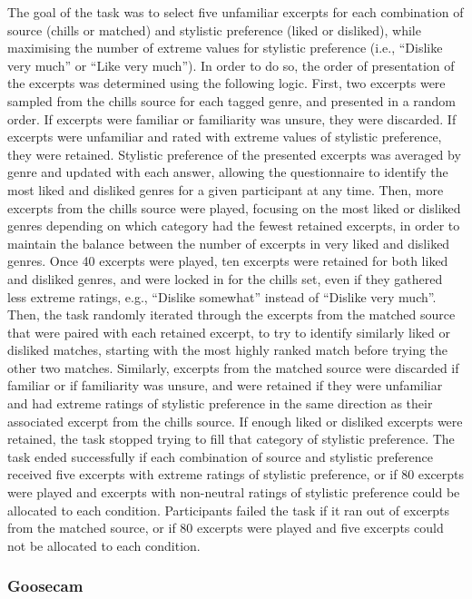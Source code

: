 The goal of the task was to select five unfamiliar excerpts for each combination of source (chills or matched) and stylistic preference (liked or disliked), while maximising the number of extreme values for stylistic preference (i.e., ``Dislike very much'' or ``Like very much''). In order to do so, the order of presentation of the excerpts was determined using the following logic. First, two excerpts were sampled from the chills source for each tagged genre, and presented in a random order. If excerpts were familiar or familiarity was unsure, they were discarded. If excerpts were unfamiliar and rated with extreme values of stylistic preference, they were retained. Stylistic preference of the presented excerpts was averaged by genre and updated with each answer, allowing the questionnaire to identify the most liked and disliked genres for a given participant at any time. Then, more excerpts from the chills source were played, focusing on the most liked or disliked genres depending on which category had the fewest retained excerpts, in order to maintain the balance between the number of excerpts in very liked and disliked genres. Once 40 excerpts were played, ten excerpts were retained for both liked and disliked genres, and were locked in for the chills set, even if they gathered less extreme ratings, e.g., ``Dislike somewhat'' instead of ``Dislike very much''. Then, the task randomly iterated through the excerpts from the matched source that were paired with each retained excerpt, to try to identify similarly liked or disliked matches, starting with the most highly ranked match before trying the other two matches. Similarly, excerpts from the matched source were discarded if familiar or if familiarity was unsure, and were retained if they were unfamiliar and had extreme ratings of stylistic preference in the same direction as their associated excerpt from the chills source. If enough liked or disliked excerpts were retained, the task stopped trying to fill that category of stylistic preference. The task ended successfully if each combination of source and stylistic preference received five excerpts with extreme ratings of stylistic preference, or if 80 excerpts were played and excerpts with non-neutral ratings of stylistic preference could be allocated to each condition. Participants failed the task if it ran out of excerpts from the matched source, or if 80 excerpts were played and five excerpts could not be allocated to each condition.

\subsubsection{Goosecam}

